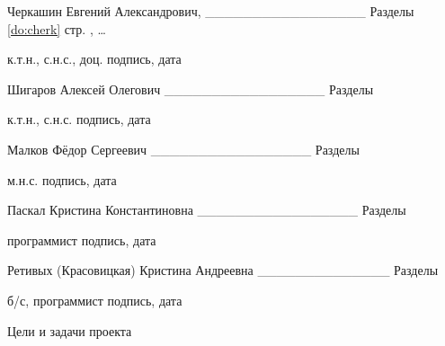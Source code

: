 \documentclass[a4paper,12pt,openany,final]{extreport}
\begin{document}
\begin{titlepage}
Черкашин Евгений Александрович, \_\_\_\_\_\_\_\_\_\_\_\_\_\_\_\_\_
Разделы \ref{do:cherk} стр. \pageref{do:cherk}, \ldots

к.т.н., с.н.с., доц. подпись, дата

Шигаров Алексей Олегович \_\_\_\_\_\_\_\_\_\_\_\_\_\_\_\_\_ Разделы

к.т.н., с.н.с. подпись, дата

Малков Фёдор Сергеевич \_\_\_\_\_\_\_\_\_\_\_\_\_\_\_\_\_ Разделы

м.н.с. подпись, дата

Паскал Кристина Константиновна \_\_\_\_\_\_\_\_\_\_\_\_\_\_\_\_\_
Разделы

программист подпись, дата

Ретивых (Красовицкая) Кристина Андреевна \_\_\_\_\_\_\_\_\_\_\_\_\_\_
Разделы

б/с, программист подпись, дата
\end{titlepage}
\begin{titlepage}
\tableofcontents{}
\end{titlepage}
\thispagestyle{empty}
Цели и задачи проекта
\end{document}
